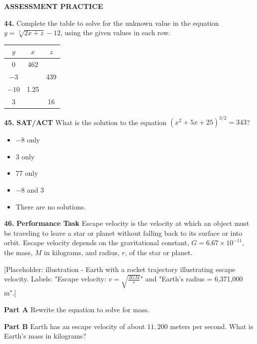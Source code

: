 \documentclass{article}
\newenvironment{practice}[2]{\noindent\textbf{#1.}}{}
\newcommand{\placeholder}[2]{[Placeholder: #1 - #2]}
\begin{document}
\begin{minipage}[t]{0.5\textwidth}
\textbf{\large ASSESSMENT PRACTICE}

\begin{practice}{44}{}
Complete the table to solve for the unknown value in the equation $y = \sqrt[3]{2x + z} - 12$, using the given values in each row.

\begin{center}
\begin{tabular}{|c|c|c|}
\hline
\textbf{$y$} & \textbf{$x$} & \textbf{$z$} \\
\hline
0 & 462 & \\
\hline
$-3$ & & 439 \\
\hline
$-10$ & 1.25 & \\
\hline
3 & & 16 \\
\hline
\end{tabular}
\end{center}
\end{practice}

\begin{practice}{45}{}
\textbf{SAT/ACT} What is the solution to the equation $(x^2 + 5x + 25)^{3/2} = 343$?

\begin{itemize}
    \item[A] $-8$ only
    \item[B] 3 only
    \item[C] 77 only
    \item[D] $-8$ and 3
    \item[E] There are no solutions.
\end{itemize}
\end{practice}

\begin{practice}{46}{}
\textbf{Performance Task} Escape velocity is the velocity at which an object must be traveling to leave a star or planet without falling back to its surface or into orbit. Escape velocity depends on the gravitational constant, $G = 6.67 \times 10^{-11}$, the mass, $M$ in kilograms, and radius, $r$, of the star or planet.

\placeholder{illustration}{Earth with a rocket trajectory illustrating escape velocity. Labels: "Escape velocity: $v = \sqrt{\frac{2GM}{r}}$" and "Earth's radius = 6,371,000 m".}

\textbf{Part A} Rewrite the equation to solve for mass.

\textbf{Part B} Earth has an escape velocity of about $11,200$ meters per second. What is Earth's mass in kilograms?
\end{practice}
\end{minipage}
\end{document}
